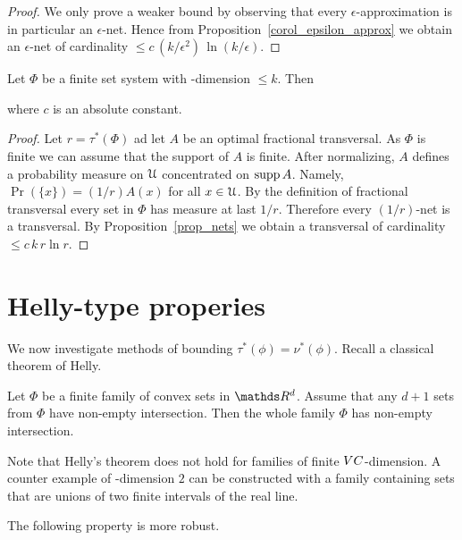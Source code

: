 \documentclass[scombinatorics.tex]{subfiles}
\begin{document}
\begin{proof}
We only prove a weaker bound by observing that every $\epsilon$-approximation is in particular an $\epsilon$-net. Hence from Proposition~\ref{corol_epsilon_approx} we obtain an $\epsilon$-net of cardinality $\displaystyle\le c\,(k/\epsilon^2)\,\ln(k/\epsilon)$.
\end{proof}

\begin{proposition}\label{prop_bound_fractional_trans}
Let $\Phi$ be a finite set system with \vc-dimension $\le k$. Then 


where $c$ is an absolute constant.
\end{proposition}

\begin{proof}
Let $r=\tau^*(\Phi)$ ad let $A$ be an optimal fractional transversal.
As $\Phi$ is finite we can assume that the support of $A$ is finite.
After normalizing, $A$ defines a probability measure on $\EuScript U$ concentrated on $\mathop{\rm supp} A$.
Namely, $\Pr(\{x\})=(1/r)A(x)$ for all $x\in\EuScript U$.
By the definition of fractional transversal every set in $\Phi$ has measure at last $1/r$.
Therefore every $(1/r)$-net is a transversal.
By Proposition~\ref{prop_nets} we obtain a transversal of cardinality $\le c\,k\, r \ln r$.
\end{proof}

\section{Helly-type properies}

We now investigate methods of bounding $\tau^*(\phi)=\nu^*(\phi)$.
Recall a classical theorem of Helly.

\begin{proposition}
Let $\Phi$ be a finite family of convex sets in $\RR^d$.
Assume that any $d+1$ sets from $\Phi$ have non-empty intersection.
Then the whole family $\Phi$ has non-empty intersection.
\end{proposition}

Note that Helly's theorem does not hold for families of finite ${\footnotesize VC}$-dimension.
A counter example of \vc-dimension $2$ can be constructed with a family containing sets that are unions of two finite intervals of the real line.

The following property is more robust.
\end{document}
